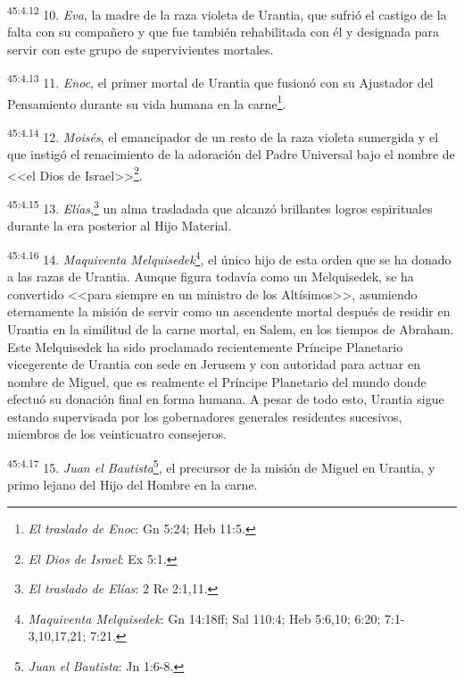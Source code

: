 \par
\textsuperscript{45:4.12} 10. \textit{Eva}, la madre de la raza violeta de Urantia, que sufrió el castigo de la falta con su compañero y que fue también rehabilitada con él y designada para servir con este grupo de supervivientes mortales.

\par
\textsuperscript{45:4.13} 11. \textit{Enoc}, el primer mortal de Urantia que fusionó con su Ajustador del Pensamiento durante su vida humana en la carne\footnote{\textit{El traslado de Enoc}: Gn 5:24; Heb 11:5.}.

\par
\textsuperscript{45:4.14} 12. \textit{Moisés}, el emancipador de un resto de la raza violeta sumergida y el que instigó el renacimiento de la adoración del Padre Universal bajo el nombre de <<el Dios de Israel>>\footnote{\textit{El Dios de Israel}: Ex 5:1.}.

\par
\textsuperscript{45:4.15} 13. \textit{Elías},\footnote{\textit{El traslado de Elías}: 2 Re 2:1,11.} un alma trasladada que alcanzó brillantes logros espirituales durante la era posterior al Hijo Material.

\par
\textsuperscript{45:4.16} 14. \textit{Maquiventa Melquisedek}\footnote{\textit{Maquiventa Melquisedek}: Gn 14:18ff; Sal 110:4; Heb 5:6,10; 6:20; 7:1-3,10,17,21; 7:21.}, el único hijo de esta orden que se ha donado a las razas de Urantia. Aunque figura todavía como un Melquisedek, se ha convertido <<para siempre en un ministro de los Altísimos>>, asumiendo eternamente la misión de servir como un ascendente mortal después de residir en Urantia en la similitud de la carne mortal, en Salem, en los tiempos de Abraham. Este Melquisedek ha sido proclamado recientemente Príncipe Planetario vicegerente de Urantia con sede en Jerusem y con autoridad para actuar en nombre de Miguel, que es realmente el Príncipe Planetario del mundo donde efectuó su donación final en forma humana. A pesar de todo esto, Urantia sigue estando supervisada por los gobernadores generales residentes sucesivos, miembros de los veinticuatro consejeros.

\par
\textsuperscript{45:4.17} 15. \textit{Juan el Bautista}\footnote{\textit{Juan el Bautista}: Jn 1:6-8.}, el precursor de la misión de Miguel en Urantia, y primo lejano del Hijo del Hombre en la carne.

